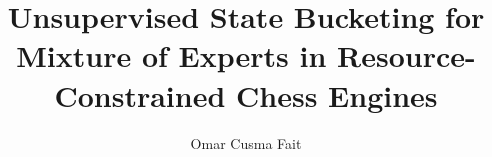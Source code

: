 \documentclass[a4paper,11pt,oneside,openany]{book}
\title{Unsupervised State Bucketing for Mixture of Experts in Resource-Constrained Chess Engines}
\author{Omar Cusma Fait}
\numberwithin{equation}{section}
\begin{document}



\frontmatter


{\hypersetup{linkcolor=black}
    \tableofcontents
}

\mainmatter
\renewcommand{\chaptermark}[1]{\markboth{\MakeUppercase{\chaptername\ \thechapter.\ #1}}{}}









\pagestyle{fancy}
\renewcommand{\chaptermark}[1]{\markboth{\MakeUppercase{APPENDIX\ \thechapter.\ #1}}{}}
\appendix
\label{appendix}


\backmatter
\printbibliography


\end{document}
